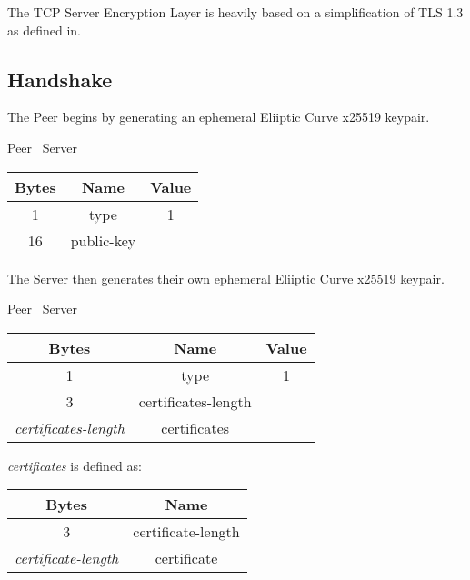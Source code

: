 \documentclass{article}
\begin{document}
    The TCP Server Encryption Layer is heavily based on a simplification of TLS 1.3 as defined in. %

    \subsection{Handshake}

    The Peer begins by generating an ephemeral Eliiptic Curve x25519 keypair.

    \begin{center}
        Peer \textrightarrow\ Server\\
        \begin{tabular}{|c|c|c|}
            \hline
            \textbf{Bytes} & \textbf{Name} & \textbf{Value} \\
            \hline
            1              & type          & 1              \\
            \hline
            16             & public-key    &                \\
            \hline
        \end{tabular}
    \end{center}


    The Server then generates their own ephemeral Eliiptic Curve x25519 keypair.

    \begin{center}
        Peer \textrightarrow\ Server\\
        \begin{tabular}{|c|c|c|}
            \hline
            \textbf{Bytes}             & \textbf{Name}       & \textbf{Value} \\
            \hline
            1                          & type                & 1              \\
            \hline
            3                          & certificates-length &                \\
            \hline
            \emph{certificates-length} & certificates        &                \\
            \hline
        \end{tabular}
    \end{center}

    \emph{certificates} is defined as:

    \begin{center}
        \begin{tabular}{|c|c|}
            \hline
            \textbf{Bytes}            & \textbf{Name}      \\
            \hline
            3                         & certificate-length \\
            \hline
            \emph{certificate-length} & certificate       \\
            \hline
        \end{tabular}
    \end{center}
\end{document}
